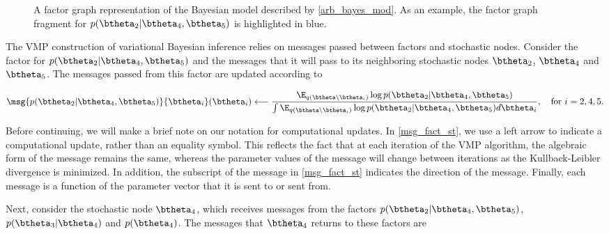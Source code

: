 \documentclass[12pt]{article}
\theoremstyle{plain}
\theoremstyle{definition}
\theoremstyle{remark}
\begin{document}
\begin{figure}
\caption{
	A factor graph representation of the Bayesian model described by \eqref{arb_bayes_mod}. As an example,
	the factor graph fragment for $p (\btheta_2 | \btheta_4, \btheta_5)$ is highlighted in blue.
}
\label{fig:arb_bayes_mod_fg}
\end{figure}

The VMP construction of variational Bayesian inference relies on messages passed between factors and stochastic
nodes. Consider the factor for $p (\btheta_2 | \btheta_4, \btheta_5)$ and the messages that it will pass to its
neighboring stochastic nodes $\btheta_2$, $\btheta_4$ and $\btheta_5$. The messages passed from this
factor are updated according to

\begin{equation}
	\msg{p (\btheta_2 | \btheta_4, \btheta_5)}{\btheta_i} (\btheta_i)
		\longleftarrow
			\frac{
				\E_{q(\btheta \setminus \btheta_i)} \log p (\btheta_2 | \btheta_4, \btheta_5)
			} {
				\int \E_{q(\btheta \setminus \btheta_i)} \log p (\btheta_2 | \btheta_4, \btheta_5) d\btheta_i
			},
	\quad \text{for $i = 2, 4, 5$.}
\label{msg_fact_st}
\end{equation}

\noindent Before continuing, we will make a brief note on our notation for computational updates. In \eqref{msg_fact_st},
we use a left arrow to indicate a computational update, rather than an equality symbol. This reflects the fact that at each
iteration of the VMP algorithm, the algebraic form of the message remains the same, whereas the parameter values of the
message will change between iterations as the Kullback-Leibler divergence is minimized. In addition, the subscript
of the message in \eqref{msg_fact_st} indicates the direction of the message. Finally, each message is a function of
the parameter vector that it is sent to or sent from.

Next, consider the stochastic node $\btheta_4$, which receives messages from the factors
$p (\btheta_2 | \btheta_4, \btheta_5)$, $p (\btheta_3 | \btheta_4)$ and $p (\btheta_4)$. The messages that $\btheta_4$
returns to these factors are
\end{document}
